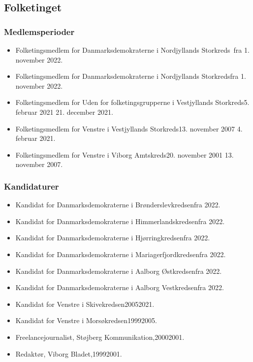 \documentclass[11pt, a4paper]{awesome-cv}
\begin{document}
\begin{cvletter}
\subsection*{Folketinget}
\subsubsection*{Medlemsperioder}
\begin{itemize}
\item Folketingsmedlem for Danmarksdemokraterne i Nordjyllands Storkreds fra 1. november 2022.
\item Folketingsmedlem for Danmarksdemokraterne i Nordjyllands Storkredsfra 1. november 2022.
\item Folketingsmedlem for Uden for folketingsgrupperne i Vestjyllands Storkreds5. februar 2021  21. december 2021.
\item Folketingsmedlem for Venstre i Vestjyllands Storkreds13. november 2007  4. februar 2021.
\item Folketingsmedlem for Venstre i Viborg Amtskreds20. november 2001  13. november 2007.
\end{itemize}
\subsubsection*{Kandidaturer}
\begin{itemize}
\item Kandidat for Danmarksdemokraterne i Brønderslevkredsenfra 2022.
\item Kandidat for Danmarksdemokraterne i Himmerlandskredsenfra 2022.
\item Kandidat for Danmarksdemokraterne i Hjørringkredsenfra 2022.
\item Kandidat for Danmarksdemokraterne i Mariagerfjordkredsenfra 2022.
\item Kandidat for Danmarksdemokraterne i Aalborg Østkredsenfra 2022.
\item Kandidat for Danmarksdemokraterne i Aalborg Vestkredsenfra 2022.
\item Kandidat for Venstre i Skivekredsen20052021.
\item Kandidat for Venstre i Morsøkredsen19992005.
\end{itemize}
\begin{itemize}
\item Freelancejournalist, Støjberg Kommunikation,20002001.
\item Redaktør, Viborg Bladet,19992001.
\end{itemize}
\end{cvletter}
\end{document}
